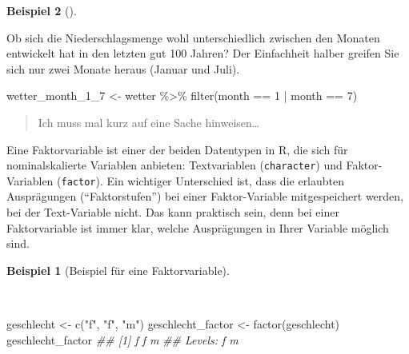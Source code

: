 \documentclass[
  letterpaper,
]{scrbook}
\newenvironment{Shaded}{\begin{snugshade}}{\end{snugshade}}
\newcommand{\DecValTok}[1]{\textcolor[rgb]{0.68,0.00,0.00}{#1}}
\newcommand{\DocumentationTok}[1]{\textcolor[rgb]{0.37,0.37,0.37}{\textit{#1}}}
\newcommand{\FunctionTok}[1]{\textcolor[rgb]{0.28,0.35,0.67}{#1}}
\newcommand{\NormalTok}[1]{\textcolor[rgb]{0.00,0.23,0.31}{#1}}
\newcommand{\OtherTok}[1]{\textcolor[rgb]{0.00,0.23,0.31}{#1}}
\newcommand{\SpecialCharTok}[1]{\textcolor[rgb]{0.37,0.37,0.37}{#1}}
\newcommand{\StringTok}[1]{\textcolor[rgb]{0.13,0.47,0.30}{#1}}
\theoremstyle{definition}
\theoremstyle{definition}
\newtheorem{example}{Beispiel}[chapter]
\theoremstyle{definition}
\theoremstyle{remark}
\begin{document}
\begin{example}[]\protect\hypertarget{exm-rain1}{}\label{exm-rain1}

Ob sich die Niederschlagsmenge wohl unterschiedlich zwischen den Monaten
entwickelt hat in den letzten gut 100 Jahren? Der Einfachheit halber
greifen Sie sich nur zwei Monate heraus (Januar und Juli).

\begin{Shaded}
\begin{Highlighting}[]
\NormalTok{wetter\_month\_1\_7 }\OtherTok{\textless{}{-}}
\NormalTok{  wetter }\SpecialCharTok{\%\textgreater{}\%} 
  \FunctionTok{filter}\NormalTok{(month }\SpecialCharTok{==} \DecValTok{1}  \SpecialCharTok{|}\NormalTok{ month }\SpecialCharTok{==} \DecValTok{7}\NormalTok{) }
\end{Highlighting}
\end{Shaded}

\begin{quote}
{} Ich muss mal kurz auf eine Sache hinweisen\ldots{}
\end{quote}

Eine Faktorvariable ist einer der beiden Datentypen in R, die sich für
nominalskalierte Variablen anbieten: Textvariablen (\texttt{character})
und Faktor-Variablen (\texttt{factor}). Ein wichtiger Unterschied ist,
dass die erlaubten Ausprägungen (\enquote{Faktorstufen}) bei einer
Faktor-Variable mitgespeichert werden, bei der Text-Variable nicht. Das
kann praktisch sein, denn bei einer Faktorvariable ist immer klar,
welche Ausprägungen in Ihrer Variable möglich sind.

\begin{example}[Beispiel für eine
Faktorvariable]\protect\hypertarget{exm-factor1}{}\label{exm-factor1}

~

\begin{Shaded}
\begin{Highlighting}[]
\NormalTok{geschlecht }\OtherTok{\textless{}{-}} \FunctionTok{c}\NormalTok{(}\StringTok{"f"}\NormalTok{, }\StringTok{"f"}\NormalTok{, }\StringTok{"m"}\NormalTok{)}
\NormalTok{geschlecht\_factor }\OtherTok{\textless{}{-}} \FunctionTok{factor}\NormalTok{(geschlecht)}
\NormalTok{geschlecht\_factor}
\DocumentationTok{\#\# [1] f f m}
\DocumentationTok{\#\# Levels: f m}
\end{Highlighting}
\end{Shaded}

\end{example}


\end{example}
\end{document}
